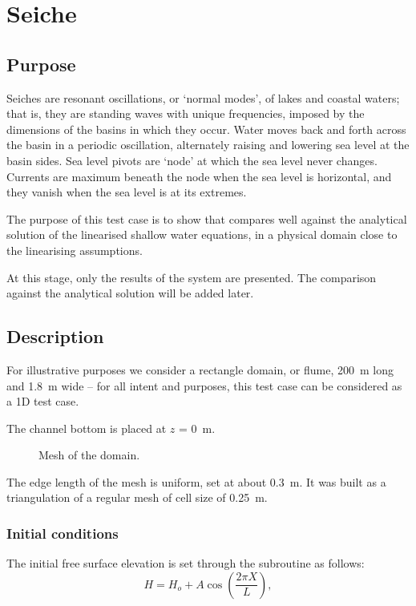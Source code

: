 \chapter{Seiche}

\section{Purpose}
Seiches are resonant oscillations, or ‘normal modes’, of lakes and coastal waters;
that is, they are standing waves with unique frequencies, imposed by the
dimensions of the basins in which they occur. Water moves back and forth across
the basin in a periodic oscillation, alternately raising and lowering sea level
at the basin sides.
Sea level pivots are ‘node’ at which the sea level never changes.
Currents are maximum beneath the node when the sea level is horizontal, and they
vanish when the sea level is at its extremes.

The purpose of this test case is to show that  compares well against
the analytical solution of the linearised shallow water equations, in a physical
domain close to the linearising assumptions.

At this stage, only the results of the \tel system are presented.
The comparison against the analytical solution will be added later.

\section{Description}
For illustrative purposes we consider a rectangle domain, or flume, 200~m long
and 1.8~m wide – for all intent and purposes, this test case can be considered
as a 1D test case.

The channel bottom is placed at $z$ = 0~m.

\begin{figure}[H]
\centering
{}
\caption{Mesh of the domain.}
\label{fig:seiche:mesh}
\end{figure}

The edge length of the mesh is uniform, set at about 0.3~m.
It was built as a triangulation of a regular mesh of cell size of 0.25~m.

\subsection{Initial conditions}
The initial free surface elevation is set through the subroutine
 as follows:
\begin{equation}
H = H_o + A \cos( \frac{2 \pi X}{L} ),
\end{equation}

